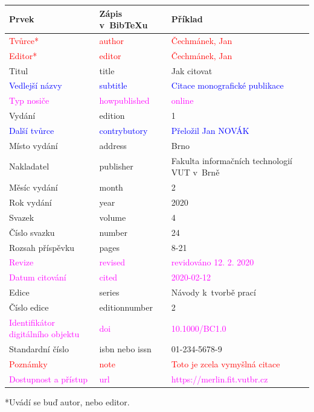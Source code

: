 \begin{tabularx}{\linewidth}{X X X}
    Prvek & Zápis v~BibTeXu & Příklad\\\hline
    \textcolor{red}{Tvůrce*} & \textcolor{red}{author} & \textcolor{red}{Čechmánek, Jan}\\
    \textcolor{red}{Editor*} & \textcolor{red}{editor} & \textcolor{red}{Čechmánek, Jan}\\
    Titul & title & Jak citovat\\
    \textcolor{blue}{Vedlejší názvy} & \textcolor{blue}{subtitle} & \textcolor{blue}{Citace monografické publikace}\\
    \textcolor{magenta}{Typ nosiče} & \textcolor{magenta}{howpublished} & \textcolor{magenta}{online}\\
    Vydání & edition & 1\\
    \textcolor{blue}{Další tvůrce} & \textcolor{blue}{contrybutory} & \textcolor{blue}{Přeložil Jan NOVÁK}\\
    Místo vydání & address & Brno\\
    Nakladatel & publisher & Fakulta informačních technologií VUT v~Brně\\
    Měsíc vydání & month & 2\\
    Rok vydání & year & 2020\\
    Svazek & volume & 4\\
    Číslo svazku & number & 24\\
    Rozsah příspěvku & pages & 8-21\\
    \textcolor{magenta}{Revize} & \textcolor{magenta}{revised} & \textcolor{magenta}{revidováno 12. 2. 2020}\\
    \textcolor{magenta}{Datum citování} & \textcolor{magenta}{cited} & \textcolor{magenta}{2020-02-12}\\
    Edice & series & Návody k~tvorbě prací\\
    Číslo edice & editionnumber & 2\\
    \textcolor{magenta}{Identifikátor digitálního objektu} & \textcolor{magenta}{doi} & \textcolor{magenta}{10.1000/BC1.0}\\
    Standardní číslo & isbn nebo issn & 01-234-5678-9\\
    \textcolor{red}{Poznámky} & \textcolor{red}{note} & \textcolor{red}{Toto je zcela vymyšlná citace}\\
    \textcolor{magenta}{Dostupnost a přístup} & \textcolor{magenta}{url} & \textcolor{magenta}{https://merlin.fit.vutbr.cz}
\end{tabularx}
*Uvádí se buď autor, nebo editor.

